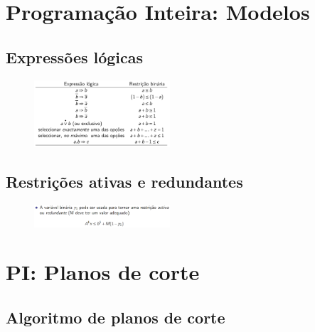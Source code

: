 \documentclass[10pt, a4paper]{article}
\begin{document}
\begin{multicols}{2}
\section{Programação Inteira: Modelos}
\thispagestyle{empty}

\subsection{Expressões lógicas}

\begin{figure}[H]
    \centering
    \includegraphics[width=0.45\textwidth]{expr_logicas.png}
\end{figure}

\subsection{Restrições ativas e redundantes}

\begin{figure}[H]
    \centering
    \includegraphics[width=0.45\textwidth]{restricao_ativa.png}
\end{figure}



\section{PI: Planos de corte}


\subsection{Algoritmo de planos de corte}


\end{multicols}
\end{document}
